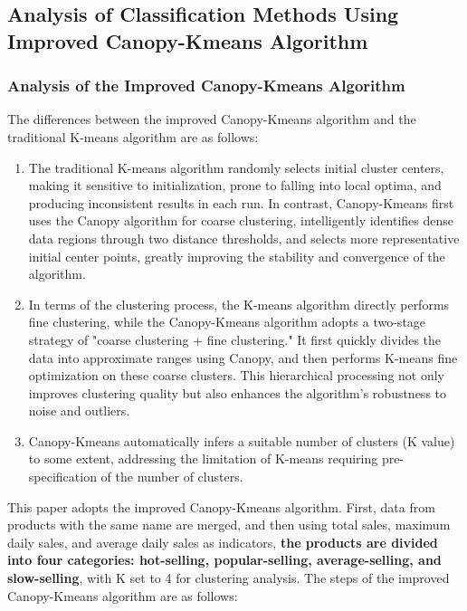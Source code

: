 \documentclass{article}
\begin{document}
	
	\subsection{Analysis of Classification Methods Using Improved Canopy-Kmeans Algorithm}
	
	\subsubsection{Analysis of the Improved Canopy-Kmeans Algorithm}
	
	The differences between the improved Canopy-Kmeans algorithm and the traditional K-means algorithm are as follows:
	
	\begin{enumerate}[label=\arabic*.]
		\item The traditional K-means algorithm randomly selects initial cluster centers, making it sensitive to initialization, prone to falling into local optima, and producing inconsistent results in each run. In contrast, Canopy-Kmeans first uses the Canopy algorithm for coarse clustering, intelligently identifies dense data regions through two distance thresholds, and selects more representative initial center points, greatly improving the stability and convergence of the algorithm.
		
		\item In terms of the clustering process, the K-means algorithm directly performs fine clustering, while the Canopy-Kmeans algorithm adopts a two-stage strategy of "coarse clustering + fine clustering." It first quickly divides the data into approximate ranges using Canopy, and then performs K-means fine optimization on these coarse clusters. This hierarchical processing not only improves clustering quality but also enhances the algorithm's robustness to noise and outliers.
		
		\item Canopy-Kmeans automatically infers a suitable number of clusters (K value) to some extent, addressing the limitation of K-means requiring pre-specification of the number of clusters.
	\end{enumerate}
	
	This paper adopts the improved Canopy-Kmeans algorithm. First, data from products with the same name are merged, and then using total sales, maximum daily sales, and average daily sales as indicators, \textbf{the products are divided into four categories: hot-selling, popular-selling, average-selling, and slow-selling}, with K set to 4 for clustering analysis. The steps of the improved Canopy-Kmeans algorithm are as follows:
	
\end{document}
